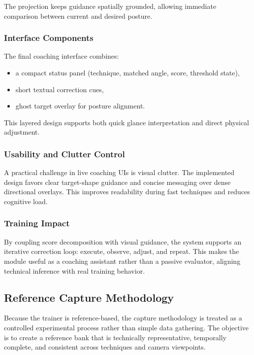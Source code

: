 \documentclass[12pt]{article}
\begin{document}
{The projection keeps guidance spatially grounded, allowing immediate comparison between current and desired posture.

\subsubsection{Interface Components}

The final coaching interface combines:

\begin{itemize}
    \item a compact status panel (technique, matched angle, score, threshold state),
    \item short textual correction cues,
    \item ghost target overlay for posture alignment.
\end{itemize}

This layered design supports both quick glance interpretation and direct physical adjustment.

\subsubsection{Usability and Clutter Control}

A practical challenge in live coaching UIs is visual clutter. The implemented design favors clear target-shape guidance and concise messaging over dense directional overlays. This improves readability during fast techniques and reduces cognitive load.

\subsubsection{Training Impact}

By coupling score decomposition with visual guidance, the system supports an iterative correction loop: execute, observe, adjust, and repeat. This makes the module useful as a coaching assistant rather than a passive evaluator, aligning technical inference with real training behavior.

\subsection{Reference Capture Methodology}

Because the trainer is reference-based, the capture methodology is treated as a controlled experimental process rather than simple data gathering. The objective is to create a reference bank that is technically representative, temporally complete, and consistent across techniques and camera viewpoints.

}
\end{document}
